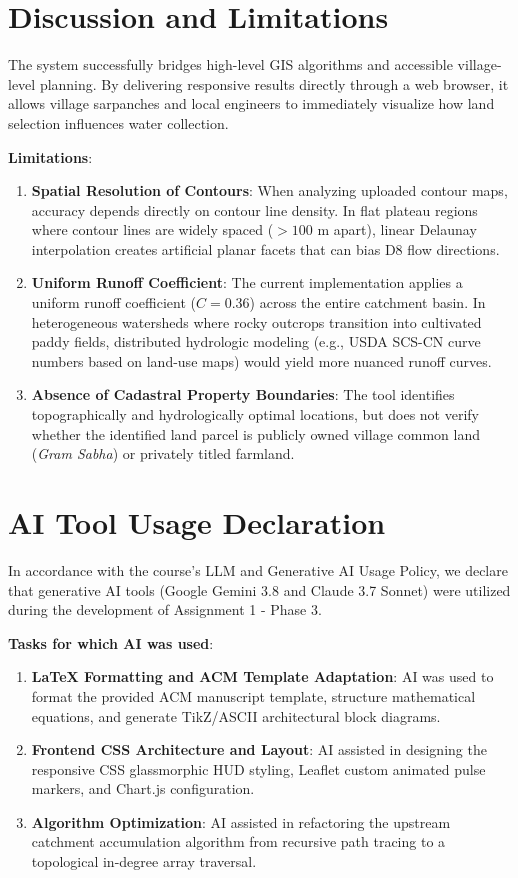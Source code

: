 \documentclass[manuscript,screen,nonacm]{acmart}
\begin{document}
\section{Discussion and Limitations}
\label{sec:discussion}
The system successfully bridges high-level GIS algorithms and accessible village-level planning. By delivering responsive results directly through a web browser, it allows village sarpanches and local engineers to immediately visualize how land selection influences water collection.

\noindent \textbf{Limitations}:
\begin{enumerate}
    \item \textbf{Spatial Resolution of Contours}: When analyzing uploaded contour maps, accuracy depends directly on contour line density. In flat plateau regions where contour lines are widely spaced ($>100\text{ m}$ apart), linear Delaunay interpolation creates artificial planar facets that can bias D8 flow directions.
    \item \textbf{Uniform Runoff Coefficient}: The current implementation applies a uniform runoff coefficient ($C = 0.36$) across the entire catchment basin. In heterogeneous watersheds where rocky outcrops transition into cultivated paddy fields, distributed hydrologic modeling (e.g., USDA SCS-CN curve numbers based on land-use maps) would yield more nuanced runoff curves.
    \item \textbf{Absence of Cadastral Property Boundaries}: The tool identifies topographically and hydrologically optimal locations, but does not verify whether the identified land parcel is publicly owned village common land (\textit{Gram Sabha}) or privately titled farmland.
\end{enumerate}

\section{AI Tool Usage Declaration}
\label{sec:ai-usage}
In accordance with the course's LLM and Generative AI Usage Policy, we declare that generative AI tools (Google Gemini 3.8 and Claude 3.7 Sonnet) were utilized during the development of Assignment 1 - Phase 3. 

\noindent \textbf{Tasks for which AI was used}:
\begin{enumerate}
    \item \textbf{LaTeX Formatting and ACM Template Adaptation}: AI was used to format the provided ACM manuscript template, structure mathematical equations, and generate TikZ/ASCII architectural block diagrams.
    \item \textbf{Frontend CSS Architecture and Layout}: AI assisted in designing the responsive CSS glassmorphic HUD styling, Leaflet custom animated pulse markers, and Chart.js configuration.
    \item \textbf{Algorithm Optimization}: AI assisted in refactoring the upstream catchment accumulation algorithm from recursive path tracing to a topological in-degree array traversal.
\end{enumerate}
\end{document}
